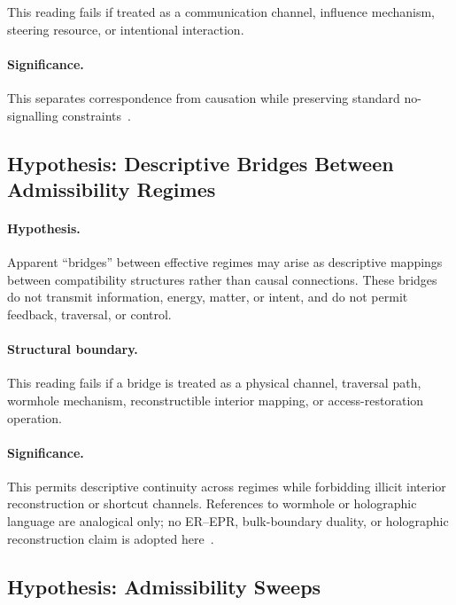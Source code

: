 \documentclass[aps,prx,onecolumn,11pt]{revtex4-2}
\theoremstyle{plain}
\theoremstyle{definition}
\theoremstyle{remark}
\begin{document}
This reading fails if treated as a communication channel, influence
mechanism, steering resource, or intentional interaction.

\paragraph{Significance.}

This separates correspondence from causation while preserving standard
no-signalling constraints~\cite{Bell1964,Tsirelson1980,Gisin1990}.

\subsection{Hypothesis: Descriptive Bridges Between Admissibility Regimes}
\label{subsec:hyp_descriptive_bridges}

\paragraph{Hypothesis.}

Apparent ``bridges'' between effective regimes may arise as descriptive
mappings between compatibility structures rather than causal
connections. These bridges do not transmit information, energy, matter,
or intent, and do not permit feedback, traversal, or control.

\paragraph{Structural boundary.}

This reading fails if a bridge is treated as a physical channel,
traversal path, wormhole mechanism, reconstructible interior mapping, or
access-restoration operation.

\paragraph{Significance.}

This permits descriptive continuity across regimes while forbidding
illicit interior reconstruction or shortcut channels. References to
wormhole or holographic language are analogical only; no ER--EPR,
bulk-boundary duality, or holographic reconstruction claim is adopted
here~\cite{Susskind1993,Susskind1995}.

\subsection{Hypothesis: Admissibility Sweeps}
\label{subsec:hyp_admissibility_sweeps}
\end{document}
